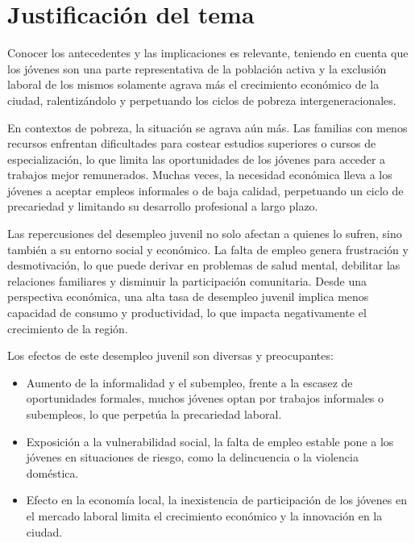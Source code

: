 \documentclass[letterpaper, 12pt]{article}
\begin{document}
\section{Justificación del tema}

Conocer los antecedentes y las implicaciones es relevante, teniendo en cuenta 
que los jóvenes son una parte representativa de la población activa y la 
exclusión laboral de los mismos solamente agrava más el crecimiento 
económico de la ciudad, ralentizándolo y perpetuando los ciclos de pobreza 
intergeneracionales. 

En contextos de pobreza, la situación se agrava aún más. Las familias con menos 
recursos enfrentan dificultades para costear estudios superiores o cursos de 
especialización, lo que limita las oportunidades de los jóvenes para acceder 
a trabajos mejor remunerados. Muchas veces, la necesidad económica lleva a 
los jóvenes a aceptar empleos informales o de baja calidad, perpetuando 
un ciclo de precariedad y limitando su desarrollo profesional a largo plazo.

Las repercusiones del desempleo juvenil no solo afectan a quienes 
lo sufren, sino también a su entorno social y económico. La falta de 
empleo genera frustración y desmotivación, lo que puede derivar en problemas 
de salud mental, debilitar las relaciones familiares y disminuir la 
participación comunitaria. Desde una perspectiva económica, una alta 
tasa de desempleo juvenil implica menos capacidad de consumo y 
productividad, lo que impacta negativamente el crecimiento de la región.

Los efectos de este desempleo juvenil son diversas y preocupantes:

\begin{itemize}
      \item Aumento de la informalidad y el subempleo, frente a la escasez de 
      oportunidades formales, muchos jóvenes optan por trabajos informales 
      o subempleos, lo que perpetúa la precariedad laboral.

      \item Exposición a la vulnerabilidad social, la falta de empleo 
      estable pone a los jóvenes en situaciones de riesgo, como la 
      delincuencia o la violencia doméstica.

      \item Efecto en la economía local, la inexistencia de participación 
      de los jóvenes en el mercado laboral limita el crecimiento 
      económico y la innovación en la ciudad.
\end{itemize}
\end{document}
